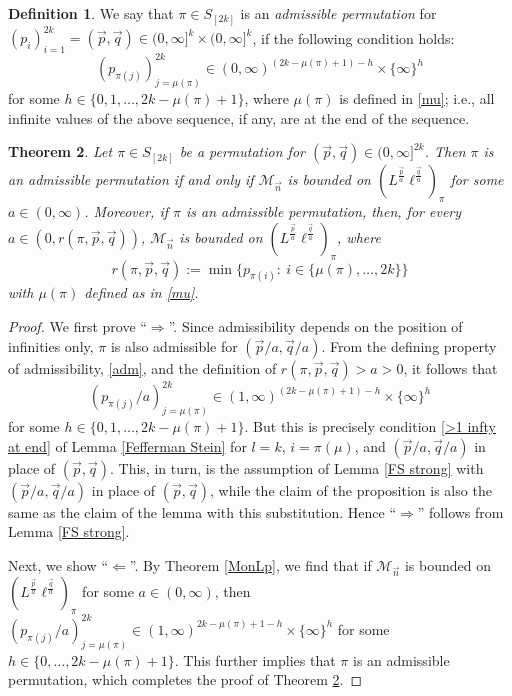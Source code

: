 \documentclass[11pt, reqno]{amsart}
\newtheorem{theorem}{Theorem}[section]
\theoremstyle{definition}
\newtheorem{definition}[theorem]{Definition}
\theoremstyle{remark}
\numberwithin{equation}{section}
\newcommand{\vn}{\vec n}
\newcommand{\vp}{\vec p}
\newcommand{\vq}{\vec q}
\begin{document}
\begin{definition}\label{adm def}
We say that $\pi\in S_{[2k]}$ is an {\em admissible permutation} for $(p_i)_{i=1}^{2k}=(\vp,\vq)\in(0,\infty]^k\times(0,\infty]^k$, if the following condition holds:
\begin{equation}\label{adm}
(p_{\pi(j)})_{j=\mu(\pi)}^{2k}\in(0,\infty)^{(2k-\mu(\pi)+1)-h}\times\{\infty\}^h
\end{equation}
for some $h\in\{0,1,\ldots,2k-\mu(\pi)+1\}$, where $\mu(\pi)$ is defined in \eqref{mu}; i.e., all infinite values of the above sequence, if any, are at the end of the sequence.
\end{definition}

\begin{theorem}\label{rescaled M}
Let $\pi\in S_{[2k]}$ be a permutation for $(\vp,\vq)\in(0,\infty]^{2k}$.
Then $\pi$ is an admissible permutation if and only if
$\mathcal M_{\vn}$ is bounded on $(L^{\frac{\vp}{a}}\ell^{\frac{\vq}{a}})_\pi$
for some $a\in(0,\infty)$.
Moreover, if $\pi$ is an admissible permutation, then,
for every $a\in(0,r(\pi,\vp,\vq))$,
$\mathcal M_{\vn}$ is bounded on $(L^{\frac{\vp}{a}}\ell^{\frac{\vq}{a}})_\pi$, where
\begin{equation}\label{rpipq-max}
r(\pi,\vp,\vq) :=\min\{p_{\pi(i)}:\ i\in\{\mu(\pi),\ldots,2k\}\}
\end{equation}
with $\mu(\pi)$ defined as in \eqref{mu}.
\end{theorem}

\begin{proof}
We first prove ``$\Longrightarrow$''.
Since admissibility depends on the position of infinities only, $\pi$ is also admissible for $(\vp/a,\vq/a)$. From the defining property of admissibility, \eqref{adm}, and the definition of $r(\pi,\vp,\vq)>a>0$, it follows that
\begin{equation*}
(p_{\pi(j)}/a)_{j=\mu(\pi)}^{2k}\in(1,\infty)^{(2k-\mu(\pi)+1)-h}\times\{\infty\}^h
\end{equation*}
for some $h\in\{0,1,\ldots,2k-\mu(\pi)+1\}$. But this is precisely condition \eqref{>1 infty at end} of Lemma \ref{Fefferman Stein} for $l=k$, $i=\pi(\mu)$, and $(\vp/a,\vq/a)$ in place of $(\vp,\vq)$. This, in turn, is the assumption of Lemma \ref{FS strong} with $(\vp/a,\vq/a)$ in place of $(\vp,\vq)$, while the claim of the proposition is also the same as the claim of the lemma with this substitution. Hence ``$\Longrightarrow$'' follows from Lemma \ref{FS strong}.

Next, we show ``$\Longleftarrow$''.
By Theorem \ref{MonLp}, we find that
if $\mathcal M_{\vn}$ is bounded on $(L^{\frac{\vp}{a}}\ell^{\frac{\vq}{a}})_\pi$
for some $a\in(0,\infty)$, then $(p_{\pi(j)}/a)_{j=\mu(\pi)}^{2k}\in(1,\infty)^{2k-\mu(\pi)+1-h}\times\{\infty\}^h$
for some $h\in\{0,\ldots,2k-\mu(\pi)+1\}$.
This further implies that $\pi$ is an admissible permutation,
which completes the proof of Theorem \ref{rescaled M}.
\end{proof}
\end{document}
